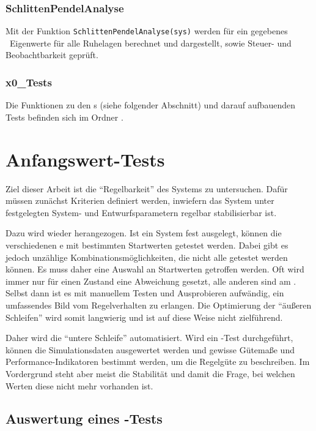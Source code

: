 \subsubsection{SchlittenPendelAnalyse}

Mit der Funktion \texttt{SchlittenPendelAnalyse(sys)} werden für ein gegebenes \zrm\ Eigenwerte für alle Ruhelagen berechnet und dargestellt, sowie Steuer- und Beobachtbarkeit geprüft.

\subsubsection{x0\_Tests}
Die Funktionen zu den \xots s (siehe folgender Abschnitt) und darauf aufbauenden Tests befinden sich im Ordner .




\section{Anfangswert-Tests}\label{sec:x0test}

Ziel dieser Arbeit ist die "`Regelbarkeit"' des Systems zu untersuchen.
Dafür müssen zunächst Kriterien definiert werden, inwiefern das System unter festgelegten System- und Entwurfsparametern regelbar \bzw stabilisierbar ist.

Dazu wird wieder  herangezogen.
Ist ein System fest ausgelegt, können die verschiedenen \ap e mit bestimmten Startwerten getestet werden.
Dabei gibt es jedoch unzählige Kombinationsmöglichkeiten, die nicht alle getestet werden können.
Es muss daher eine Auswahl an Startwerten getroffen werden.
Oft wird immer nur für einen Zustand eine Abweichung gesetzt, alle anderen sind am \ap.
Selbst dann ist es mit manuellem Testen und Ausprobieren aufwändig, ein umfassendes Bild vom Regelverhalten zu erlangen.
Die Optimierung der "`äußeren Schleifen"' wird somit langwierig und ist auf diese Weise nicht zielführend.

Daher wird die "`untere Schleife"' automatisiert.
Wird ein \ap-Test durchgeführt, können die Simulationsdaten ausgewertet werden und gewisse Gütemaße und Performance-Indikatoren bestimmt werden, um die Regelgüte zu beschreiben.
Im Vordergrund steht aber meist die Stabilität und damit die Frage, bei welchen Werten diese nicht mehr vorhanden ist.


\subsection{Auswertung eines \ap-Tests}\label{subsec:x0ausw}


